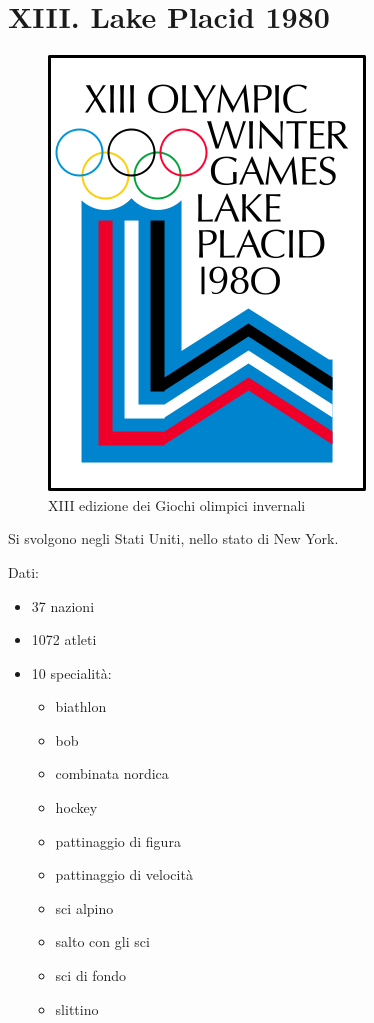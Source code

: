 \documentclass[
]{book}
\providecommand{\tightlist}{%
  \setlength{\itemsep}{0pt}\setlength{\parskip}{0pt}}
\begin{document}
\chapter*{XIII. Lake Placid 1980}\label{xiii.-lake-placid-1980}

\begin{figure}
\includegraphics[width=0.4\linewidth]{images/loghi/1980} \caption{XIII edizione dei Giochi olimpici invernali}\label{fig:unnamed-chunk-41}
\end{figure}

Si svolgono negli Stati Uniti, nello stato di New York.

Dati:

\begin{itemize}
\tightlist
\item
  37 nazioni
\item
  1072 atleti
\item
  10 specialità:

  \begin{itemize}
  \tightlist
  \item
    biathlon
  \item
    bob
  \item
    combinata nordica
  \item
    hockey
  \item
    pattinaggio di figura
  \item
    pattinaggio di velocità
  \item
    sci alpino
  \item
    salto con gli sci
  \item
    sci di fondo
  \item
    slittino
  \end{itemize}
\end{itemize}
\end{document}

